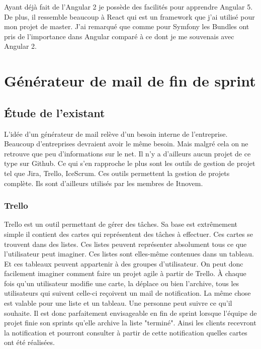 \documentclass[12pt, twoside, openright]{report}
\begin{document}
Ayant déjà fait de l'Angular 2 je possède des facilités pour apprendre Angular 5. De plus, il ressemble beaucoup à React qui est un framework que j'ai utilisé pour mon projet de master. J'ai remarqué que comme pour Symfony les Bundles ont pris de l'importance dans Angular comparé à ce dont je me souvenais avec Angular 2. 

\section{Générateur de mail de fin de sprint}

\subsection{Étude de l'existant}
L'idée d'un générateur de mail relève d'un besoin interne de l'entreprise. Beaucoup d'entreprises devraient avoir le même besoin. Mais malgré cela on ne retrouve que peu d'informations sur le net. Il n'y a d'ailleurs aucun projet de ce type sur Github. Ce qui s'en rapproche le plus sont les outils de gestion de projet tel que Jira, Trello, IceScrum. Ces outils permettent la gestion de projets complète. Ils sont d'ailleurs utilisés par les membres de Itnovem. 

\subsubsection{Trello}

Trello est un outil permettant de gérer des tâches. Sa base est extrêmement simple il contient des cartes qui représentent des tâches à effectuer. Ces cartes se trouvent dans des listes. Ces listes peuvent représenter absolument tous ce que l'utilisateur peut imaginer. Ces listes sont elles-même contenues dans un tableau. Et ces tableaux peuvent appartenir à des groupes d'utilisateur. On peut donc facilement imaginer comment faire un projet agile à partir de Trello. À chaque fois qu'un utilisateur modifie une carte, la déplace ou bien l'archive, tous les utilisateurs qui suivent celle-ci reçoivent un mail de notification. La même chose est valable pour une liste et un tableau. Une personne peut suivre ce qu'il souhaite. Il est donc parfaitement envisageable en fin de sprint lorsque l'équipe de projet finie son sprints qu'elle archive la liste "terminé". Ainsi les clients recevront la notification et pourront consulter à partir de cette notification quelles cartes ont été réalisées. 
\end{document}
